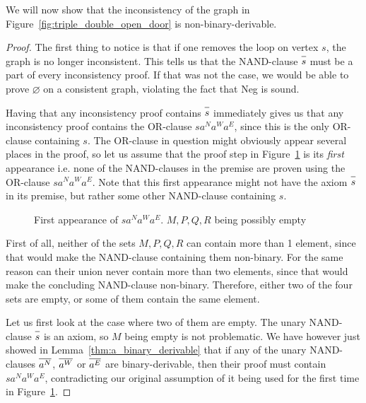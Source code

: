 We will now show that the inconsistency of the graph in Figure~\ref{fig:triple_double_open_door} is non-binary-derivable.
\begin{proof}
The first thing to notice is that if one removes the loop on vertex $s$, the graph is no longer inconsistent.
This tells us that the NAND-clause $\ol{s}$ must be a part of every inconsistency proof.
If that was not the case, we would be able to prove $\varnothing$ on a consistent graph, violating the fact that Neg is sound.

Having that any inconsistency proof contains $\ol{s}$ immediately gives us that any inconsistency proof contains the OR-clause $sa^Na^Wa^E$, since this is the only OR-clause containing $s$.
The OR-clause in question might obviously appear several places in the proof, so let us assume that the proof step in Figure~\ref{fig:triple_double_proof_step} is its \textit{first} appearance i.e. none of the NAND-clauses in the premise are proven using the OR-clause $sa^Na^Wa^E$.
Note that this first appearance might not have the axiom $\ol{s}$ in its premise, but rather some other NAND-clause containing $s$.\par
\begin{figure}[!h]
  \centering
  \begin{prooftree*}
    \Hypo{\dots}
    \Hypo{\dots}
    \Hypo{\dots}
    \Hypo{\dots}
  \end{prooftree*}
  \caption{First appearance of $sa^Na^Wa^E$. $M,P,Q,R$ being possibly empty}
  \label{fig:triple_double_proof_step}
\end{figure}
First of all, neither of the sets $M,P,Q,R$ can contain more than 1 element, since that would make the NAND-clause containing them non-binary.
For the same reason can their union never contain more than two elements, since that would make the concluding NAND-clause non-binary.
Therefore, either two of the four sets are empty, or some of them contain the same element.

Let us first look at the case where two of them are empty.
The unary NAND-clause $\ol{s}$ is an axiom, so $M$ being empty is not problematic.
We have however just showed in Lemma~\ref{thm:a_binary_derivable} that if any of the unary NAND-clauses $\ol{a^N}$, $\ol{a^W}$ or $\ol{a^E}$ are binary-derivable, then their proof must contain $sa^Na^Wa^E$, contradicting our original assumption of it being used for the first time in Figure~\ref{fig:triple_double_proof_step}.


\end{proof}
